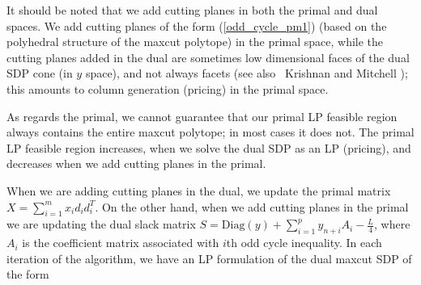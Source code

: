\documentclass[12pt]{article}
\begin{document}
It should be noted that we add cutting planes in both the primal
and dual spaces. We add cutting planes of the form
(\ref{odd_cycle_pm1}) (based on the polyhedral structure of the
maxcut polytope) in the primal space, while the cutting planes
added in the dual are sometimes low dimensional faces of the dual
SDP cone (in $y$ space), and not always facets (see also~ Krishnan
and Mitchell \cite{kartik5}); this amounts to column generation
(pricing) in the primal space.

As regards the primal, we cannot guarantee that our primal LP
feasible region always contains the entire maxcut polytope; in
most cases it does not. The primal LP feasible region increases,
when we solve the dual SDP as an LP (pricing), and decreases when
we add cutting planes in the primal.

When we are adding cutting planes in the dual, we update the
primal matrix $X = \displaystyle \sum_{i=1}^mx_id_id_i^T$. On the
other hand, when we add cutting planes in the primal we are
updating the dual slack matrix $ S = \mbox{Diag}(y) +
\displaystyle \sum_{i=1}^p y_{n+i}A_i - \frac{L}{4}$, where $A_i$
is the coefficient matrix associated with $i$th odd cycle
inequality. In each iteration of the algorithm, we have an LP
formulation of the dual maxcut SDP of the form
\end{document}
